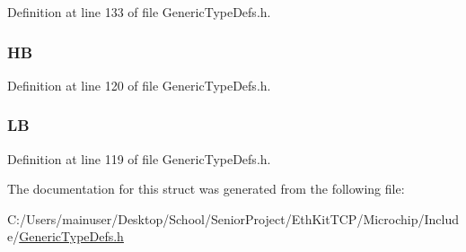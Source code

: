 Definition at line 133 of file Generic\+Type\+Defs.\+h.

\hypertarget{struct_u_i_n_t16___v_a_l_1_1_____p_a_c_k_e_d_adbba4c04e746293c1544e753bc685e06}{}
\subsubsection[{H\+B}]{ H\+B}\label{struct_u_i_n_t16___v_a_l_1_1_____p_a_c_k_e_d_adbba4c04e746293c1544e753bc685e06}


Definition at line 120 of file Generic\+Type\+Defs.\+h.

\hypertarget{struct_u_i_n_t16___v_a_l_1_1_____p_a_c_k_e_d_ad074927327d05194b939086b9057965f}{}
\subsubsection[{L\+B}]{ L\+B}\label{struct_u_i_n_t16___v_a_l_1_1_____p_a_c_k_e_d_ad074927327d05194b939086b9057965f}


Definition at line 119 of file Generic\+Type\+Defs.\+h.



The documentation for this struct was generated from the following file\+:\begin{DoxyCompactItemize}
\item 
C\+:/\+Users/mainuser/\+Desktop/\+School/\+Senior\+Project/\+Eth\+Kit\+T\+C\+P/\+Microchip/\+Include/\hyperlink{_generic_type_defs_8h}{Generic\+Type\+Defs.\+h}\end{DoxyCompactItemize}
